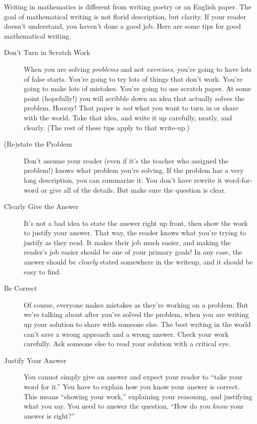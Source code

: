 Writing in mathematics is different from writing poetry or an English paper.  The goal of mathematical writing is not florid description, but clarity.  If your reader doesn't understand, you haven't done a good job.  Here are some tips for good mathematical writing.

\begin{description}
\item[Don't Turn in Scratch Work] When you are solving \emph{problems} and not \emph{exercises}, you're going to have lots of false starts.  You're going to try lots of things that don't work.  You're going to make lots of mistakes.  You're going to use scratch paper.  At some point (hopefully!) you will scribble down an idea that actually solves the problem.  Hooray!  That paper is \emph{not} what you want to turn in or share with the world.  Take that idea, and write it up carefully, neatly, and clearly.  (The rest of these tips apply to that write-up.)

\item[(Re)state the Problem]  Don't assume your reader (even if it's the teacher who assigned the problem!) knows what problem you're solving.  If the problem has a very long description, you can summarize it.  You don't have  rewrite it word-for-word or  give all of the details.  But make sure the question  is clear.

\item[Clearly Give the Answer] It's not a bad idea to state the answer right up front, then show the work to justify your answer.  That way, the reader knows what you're trying to justify as they read.  It makes their job much easier, and making the reader's job easier should be one of your primary goals!  In any case, the answer should be \emph{clearly} stated somewhere in the writeup, and it should be easy to find. 

\item[Be Correct] Of course, everyone makes mistakes as they're working on a problem.  But we're talking about after you've solved the problem, when you are writing up your solution to share with someone else.
The best writing in the world can't save a wrong approach and a wrong answer.  Check your work carefully.  Ask someone else to read your solution with a critical eye.  

\item[Justify Your Answer] You cannot simply give an answer and expect your reader to ``take your word for it.'' You have to explain how you know your answer is correct.  This means ``showing your work,'' explaining your reasoning, and justifying what you say.   You need to answer the question, ``How do you \emph{know} your answer is right?''


\end{description}
